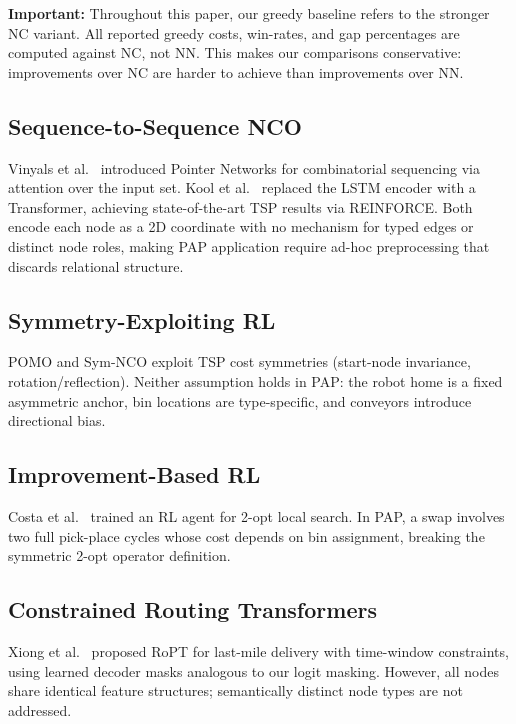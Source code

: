 \documentclass[conference]{IEEEtran}
\begin{document}
\textbf{Important:} Throughout this paper, our greedy baseline refers to the stronger NC variant. All reported greedy costs, win-rates, and gap percentages are computed against NC, not NN. This makes our comparisons conservative: improvements over NC are harder to achieve than improvements over NN.

\subsection{Sequence-to-Sequence NCO}

Vinyals et al.\ \cite{vinyals2015pointer} introduced Pointer Networks for combinatorial sequencing via attention over the input set. Kool et al.\ \cite{kool2019attention} replaced the LSTM encoder with a Transformer, achieving state-of-the-art TSP results via REINFORCE. Both encode each node as a 2D coordinate with no mechanism for typed edges or distinct node roles, making PAP application require ad-hoc preprocessing that discards relational structure.

\subsection{Symmetry-Exploiting RL}

POMO \cite{kwon2020pomo} and Sym-NCO \cite{kim2022symnco} exploit TSP cost symmetries (start-node invariance, rotation/reflection). Neither assumption holds in PAP: the robot home is a fixed asymmetric anchor, bin locations are type-specific, and conveyors introduce directional bias.

\subsection{Improvement-Based RL}

Costa et al.\ \cite{costa2020learning2opt} trained an RL agent for 2-opt local search. In PAP, a swap involves two full pick-place cycles whose cost depends on bin assignment, breaking the symmetric 2-opt operator definition.

\subsection{Constrained Routing Transformers}

Xiong et al.\ \cite{xiong2025ropt} proposed RoPT for last-mile delivery with time-window constraints, using learned decoder masks analogous to our logit masking. However, all nodes share identical feature structures; semantically distinct node types are not addressed.
\end{document}
